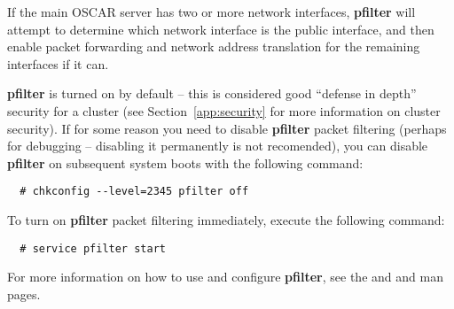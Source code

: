 If the main OSCAR server has two or more network interfaces, {\bf pfilter}
will attempt to determine which network interface is the public interface,
and then enable packet forwarding and network address translation for the 
remaining interfaces if it can.

{\bf pfilter} is turned on by default -- this is considered good
``defense in depth'' security for a cluster (see
Section~\ref{app:security} for more information on cluster security).
If for some reason you need to disable {\bf pfilter} packet filtering
(perhaps for debugging -- disabling it permanently is not recomended),
you can disable {\bf pfilter} on subsequent system boots with the
following command:

\begin{verbatim}
  # chkconfig --level=2345 pfilter off
\end{verbatim}

To turn on {\bf pfilter} packet filtering immediately, execute the
following command:

\begin{verbatim}
  # service pfilter start
\end{verbatim}

For more information on how to use and configure {\bf pfilter}, see
the  and  and
 man pages. 
